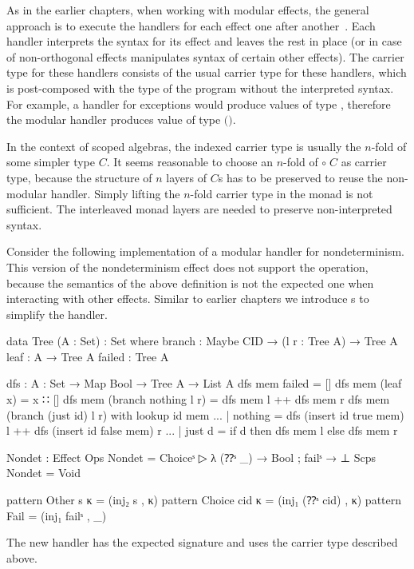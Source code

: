 As in the earlier chapters, when working with modular effects, the general
approach is to execute the handlers for each effect one after
another~\cite{DBLP:conf/haskell/SchrijversPWJ19}.
Each handler interprets the syntax for its effect and leaves the rest in place
(or in case of non-orthogonal effects manipulates syntax of certain other
effects).
The carrier type for these handlers consists of the usual carrier type for these
handlers, which is post-composed with the type of the program without the
interpreted syntax.
For example, a handler for exceptions would produce values of type
\AgdaSpace{}\AgdaSpace{},
therefore the modular handler produces value of type 
\AgdaSpace{}\AgdaSpace{}$($\AgdaSpace{}\AgdaSpace{}$)$.

In the context of scoped algebras, the  indexed carrier type is
usually the $n$-fold of some simpler type $C$.
It seems reasonable to choose an $n$-fold of
\AgdaSpace{}\AgdaSpace{}$\circ\; C$ as
carrier type, because the structure of $n$ layers of $C$s has to be preserved to
reuse the non-modular handler.
Simply lifting the $n$-fold carrier type in the monad is not sufficient.
The interleaved monad layers are needed to preserve non-interpreted syntax.

Consider the following implementation of a modular handler for nondeterminism.
This version of the nondeterminism effect does not support the
 operation, because the semantics of the above definition is
not the expected one when interacting with other effects.
Similar to earlier chapters we introduce s to simplify
the handler.

\begin{code}[hide]
data Tree (A : Set) : Set where
  branch : Maybe CID → (l r : Tree A) → Tree A
  leaf   : A → Tree A
  failed : Tree A

dfs : {A : Set} → Map Bool → Tree A → List A
dfs mem failed                   = []
dfs mem (leaf x)                 = x ∷ []
dfs mem (branch nothing    l r)  = dfs mem l ++ dfs mem r
dfs mem (branch (just id)  l r) with lookup id mem
... | nothing  = dfs (insert id true mem) l ++ dfs (insert id false mem) r
... | just d   = if d then dfs mem l else dfs mem r
\end{code}
\begin{code}
Nondet : Effect
Ops   Nondet = Choiceˢ ▷ λ{ (⁇ˢ _) → Bool ; failˢ → ⊥ }
Scps  Nondet = Void

pattern Other s κ     = (inj₂ s , κ)
pattern Choice cid κ  = (inj₁ (⁇ˢ cid) , κ)
pattern Fail          = (inj₁ failˢ , _)
\end{code}
The new handler has the expected signature and uses the carrier type described
above.

